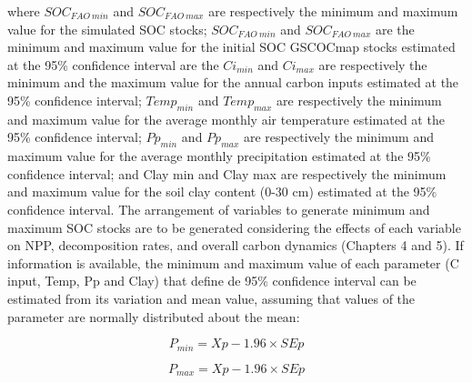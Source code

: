 \documentclass[
  10pt,
  b5paper,
]{book}
\begin{document}
where \(SOC_{FAO \ min}\) and \(SOC_{FAO \ max}\) are respectively the minimum and maximum value for the simulated SOC stocks; \(SOC_{FAO \ min}\) and \(SOC_{FAO \ max}\) are the minimum and maximum value for the initial SOC GSCOCmap stocks estimated at the 95\% confidence interval are the \(Ci_{min}\) and \(Ci_{max}\) are respectively the minimum and the maximum value for the annual carbon inputs estimated at the 95\% confidence interval; \(Temp_{min}\) and \(Temp_{max}\) are respectively the minimum and maximum value for the average monthly air temperature estimated at the 95\% confidence interval; \(Pp_{min}\) and \(Pp_{max}\) are respectively the minimum and maximum value for the average monthly precipitation estimated at the 95\% confidence interval; and Clay min and Clay max are respectively the minimum and maximum value for the soil clay content (0-30 cm) estimated at the 95\% confidence interval. The arrangement of variables to generate minimum and maximum SOC stocks are to be generated considering the effects of each variable on NPP, decomposition rates, and overall carbon dynamics (Chapters 4 and 5).
If information is available, the minimum and maximum value of each parameter (C input, Temp, Pp and Clay) that define de 95\% confidence interval can be estimated from its variation and mean value, assuming that values of the parameter are normally distributed about the mean:

\begin{equation}
\tag{12.5}
P_{min} = Xp - 1.96 \times SEp 
\end{equation}

\begin{equation}
\tag{12.6}
P_{max} = Xp - 1.96 \times SEp 
\end{equation}
\end{document}
